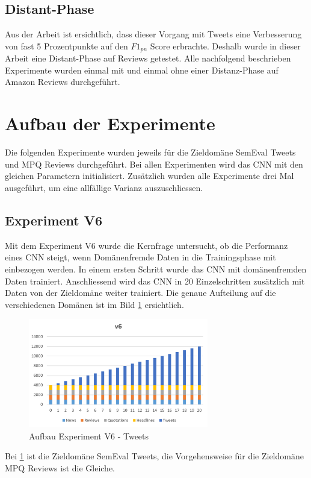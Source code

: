 \subsection{Distant-Phase}
Aus der Arbeit \cite{deriu2016sentiment} ist ersichtlich, dass dieser Vorgang mit Tweets eine Verbesserung von fast 5 Prozentpunkte auf den $F1_{pn}$ Score erbrachte.
Deshalb wurde in dieser Arbeit eine Distant-Phase auf Reviews getestet. Alle nachfolgend beschrieben Experimente wurden einmal mit und einmal ohne einer Distanz-Phase auf Amazon Reviews durchgeführt.

\section{Aufbau der Experimente}
\label{experiments}
Die folgenden Experimente wurden jeweils für die Zieldomäne SemEval Tweets und MPQ Reviews durchgeführt. Bei allen Experimenten wird das CNN mit den gleichen Parametern initialisiert. Zusätzlich wurden alle Experimente drei Mal ausgeführt, um eine allfällige Varianz auszuschliessen.
\subsection{Experiment V6}
Mit dem Experiment V6 wurde die Kernfrage untersucht, ob die Performanz eines CNN steigt, wenn Domänenfremde Daten in die Trainingsphase mit einbezogen werden.
In einem ersten Schritt wurde das CNN mit domänenfremden Daten trainiert. Anschliessend wird das CNN in 20 Einzelschritten zusätzlich mit Daten von der Zieldomäne weiter trainiert. Die genaue Aufteilung auf die verschiedenen Domänen ist im Bild \ref{fig:Method_V6} ersichtlich.
\begin{figure}[htbp]
	\centering
	\includegraphics[width=0.7\textwidth]{img/Method_V6}
	\caption{Aufbau Experiment V6 - Tweets}
	\label{fig:Method_V6}
\end{figure}
Bei \ref{fig:Method_V6} ist die Zieldomäne SemEval Tweets, die Vorgehensweise für die Zieldomäne MPQ Reviews ist die Gleiche.
